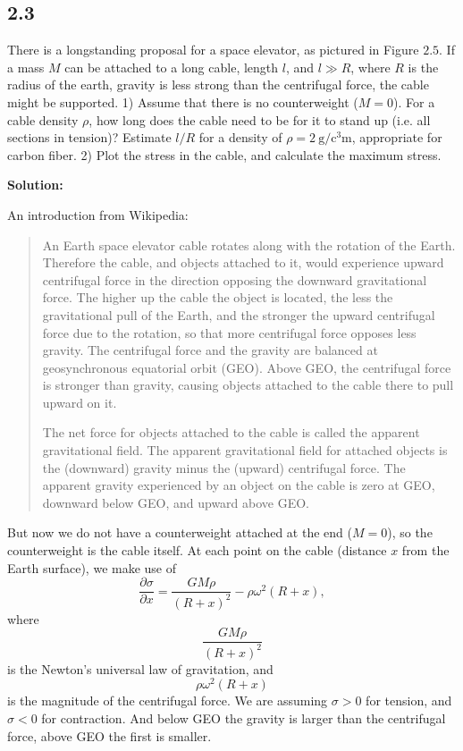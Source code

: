 \documentclass[12pt]{article}
\begin{document}
\subsection{2.3}
There is a longstanding proposal for a space elevator, as pictured in
Figure $2.5$. If a mass $M$ can be attached to a long cable, length $l$, and $l \gg R$,
where $R$ is the radius of the earth, gravity is less strong than the centrifugal force,
the cable might be supported.
1) Assume that there is no counterweight ($M = 0$). For a cable density $\rho$,
how long does the cable need to be for it to stand up (i.e. all sections in tension)?
Estimate $l/R$ for a density of $\rho = \SI{2}{\gram\per\cubic\centi\meter}$,
appropriate for carbon fiber. 2) Plot the stress in the cable, and calculate the
maximum stress.

\textbf{Solution:}

An introduction from Wikipedia:
\blockquote{
	An Earth space elevator cable rotates along with the rotation of the Earth.
	Therefore the cable, and objects attached to it, would experience upward centrifugal
	force in the direction opposing the downward gravitational force.
	The higher up the cable the object is located, the less the gravitational pull of the Earth,
	and the stronger the upward centrifugal force due to the rotation,
	so that more centrifugal force opposes less gravity.
	The centrifugal force and the gravity are balanced at geosynchronous equatorial orbit (GEO).
	Above GEO, the centrifugal force is stronger than gravity, causing objects attached to the cable there to pull upward on it.

	The net force for objects attached to the cable is called the apparent gravitational field. The apparent gravitational field for attached objects is the (downward) gravity minus the (upward) centrifugal force. The apparent gravity experienced by an object on the cable is zero at GEO, downward below GEO, and upward above GEO.
}
But now we do not have a counterweight attached at the end ($M = 0$), so the counterweight is the cable itself.
At each point on the cable (distance $x$ from the Earth surface), we make use of
\begin{equation}\label{eq:sgg}
	\frac{\partial \sigma}{\partial x} = \frac{G M \rho}{(R + x)^2} - \rho \omega^2 (R + x),
\end{equation}
where
\begin{equation}
	\frac{G M \rho}{(R + x)^2}
\end{equation}
is the Newton's universal law of gravitation, and
\begin{equation}
	\rho \omega^2 (R + x)
\end{equation}
is the magnitude of the centrifugal force.
We are assuming $\sigma > 0$ for tension, and $\sigma < 0$ for contraction. And below GEO the gravity is larger than
the centrifugal force, above GEO the first is smaller.
\end{document}
